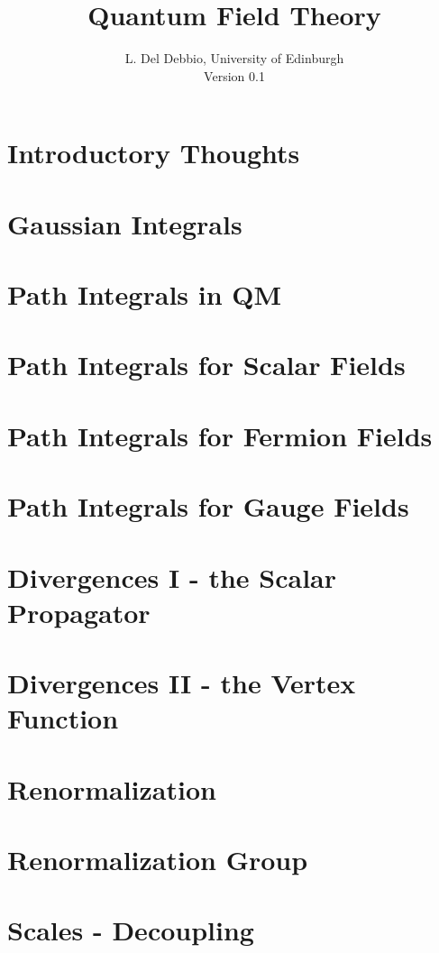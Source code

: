 \documentclass[11pt,twoside]{report}
\begin{document}
\title{Quantum Field Theory}
\author{L. Del Debbio, University of Edinburgh \\
  Version 0.1}

\maketitle
\clearemptydoublepage
\tableofcontents
\clearemptydoublepage


\chapter{Introductory Thoughts}
\label{chap:intro}


\chapter{Gaussian Integrals}
\label{chap:lec0}


\chapter{Path Integrals in QM}
\label{chap:lec1}


\chapter{Path Integrals for Scalar Fields}
\label{cha:path-integr-scal}


\chapter{Path Integrals for Fermion Fields}
\label{cha:path-integr-ferm}

\chapter{Path Integrals for Gauge Fields}
\label{cha:path-integrals-gauge}

\chapter{Divergences I - the Scalar Propagator}
\label{cha:divergences-i-scalar}

\chapter{Divergences II - the Vertex Function}
\label{cha:diverg-ii-vert}

\chapter{Renormalization}
\label{cha:renormalization}


\chapter{Renormalization Group}
\label{cha:renorm-group}

\chapter{Scales - Decoupling}
\label{cha:scales-decoupling}

\printindex
\end{document}
